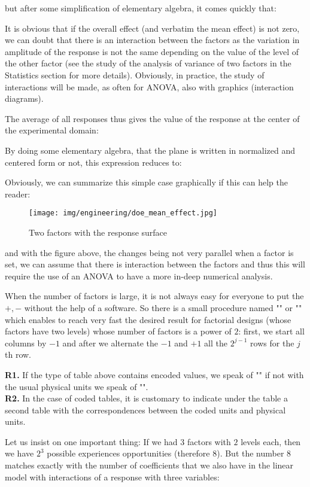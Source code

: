	but after some simplification of elementary algebra, it comes quickly that:
	
	It is obvious that if the overall effect (and verbatim the mean effect) is not zero, we can doubt that there is an interaction between the factors as the variation in amplitude of the response is not the same depending on the value of the level of the other factor (see the study of the analysis of variance of two factors in the Statistics section for more details). Obviously, in practice, the study of interactions will be made, as often for ANOVA, also with graphics (interaction diagrams).
	
	The average of all responses thus gives the value of the response at the center of the experimental domain:
	
	By doing some elementary algebra, that the plane is written in normalized and centered form or not, this expression reduces to:
	
	Obviously, we can summarize this simple case graphically if this can help the reader:
	\begin{figure}[H]
		\begin{center}
		\texttt{[image: img/engineering/doe\_mean\_effect.jpg]}
		\end{center}	
		\caption[]{Two factors with the response surface}
	\end{figure}
	and with the figure above, the changes being not very parallel when a factor is set, we can assume that there is interaction between the factors and thus this will require the use of an ANOVA to have a more in-deep numerical analysis.
	
	When the number of factors is large, it is not always easy for everyone to put the $+,-$ without the help of a software. So there is a small procedure named "" or "" which enables to reach very fast the desired result for factorial designs (whose factors have two levels) whose number of factors is a power of $2$: first, we start all columns by $-1$ and after we alternate the $-1$ and $+1$ all the $2^{j-1}$ rows for the $j$th row.
	\begin{tcolorbox}[title=Remarks,colframe=black,arc=10pt]
	\textbf{R1.} If the type of table above contains encoded values, we speak of "" if not with the usual physical units we speak of "".\\
	
	\textbf{R2.} In the case of coded tables, it is customary to indicate under the table a second table with the correspondences between the coded units and physical units.
	\end{tcolorbox}
	Let us insist on one important thing: If we had $3$ factors with $2$ levels each, then we have $2^3$ possible experiences opportunities (therefore $8$). But the number $8$ matches exactly with the number of coefficients that we also have in the linear model with interactions of a response with three variables:
	
